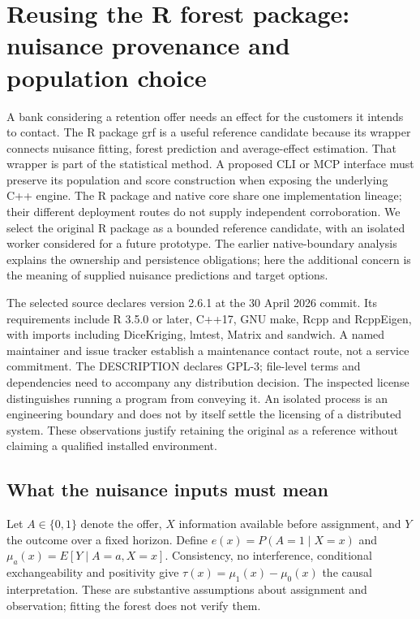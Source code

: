 \section{Reusing the R forest package: nuisance provenance and population choice}
\label{exec21:grfr-scope}
A bank considering a retention offer needs an effect for the customers it intends to contact. The R package grf is a useful reference candidate because its wrapper connects nuisance fitting, forest prediction and average-effect estimation. That wrapper is part of the statistical method. A proposed CLI or MCP interface must preserve its population and score construction when exposing the underlying C++ engine. The R package and native core share one implementation lineage; their different deployment routes do not supply independent corroboration. We select the original R package as a bounded reference candidate, with an isolated worker considered for a future prototype. The earlier native-boundary analysis explains the ownership and persistence obligations; here the additional concern is the meaning of supplied nuisance predictions and target options.~\citep{exec21_grf_reuse,exec13_grf_memory}

The selected source declares version 2.6.1 at the 30 April 2026 commit. Its requirements include R 3.5.0 or later, C++17, GNU make, Rcpp and RcppEigen, with imports including DiceKriging, lmtest, Matrix and sandwich. A named maintainer and issue tracker establish a maintenance contact route, not a service commitment. The DESCRIPTION declares GPL-3; file-level terms and dependencies need to accompany any distribution decision. The inspected license distinguishes running a program from conveying it. An isolated process is an engineering boundary and does not by itself settle the licensing of a distributed system. These observations justify retaining the original as a reference without claiming a qualified installed environment.~\citep{exec21_grf_reuse}

\subsection{What the nuisance inputs must mean}
\label{exec21:grfr-nuisance}
Let $A\in\{0,1\}$ denote the offer, $X$ information available before assignment, and $Y$ the outcome over a fixed horizon. Define $e(x)=P(A=1\mid X=x)$ and $\mu_a(x)=E[Y\mid A=a,X=x]$. Consistency, no interference, conditional exchangeability and positivity give $\tau(x)=\mu_1(x)-\mu_0(x)$ the causal interpretation. These are substantive assumptions about assignment and observation; fitting the forest does not verify them.

